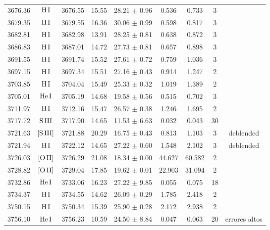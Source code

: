 \documentclass{article}
\begin{document}
\begin{table*}
\begin{adjustbox}{width=\textwidth}
\begin{tabular}{ccccccccc}
3676.36 & $\mbox{H}\thinspace \mbox{I}$ & 3676.55 & 15.55 & 28.21 $\pm$ 0.96 & 0.536 & 0.733 & 3 &  \\
3679.35 & $\mbox{H}\thinspace \mbox{I}$ & 3679.55 & 16.36 & 30.06 $\pm$ 0.99 & 0.598 & 0.817 & 3 &  \\
3682.81 & $\mbox{H}\thinspace \mbox{I}$ & 3682.98 & 13.91 & 28.25 $\pm$ 0.81 & 0.638 & 0.872 & 3 &  \\
3686.83 & $\mbox{H}\thinspace \mbox{I}$ & 3687.01 & 14.72 & 27.73 $\pm$ 0.81 & 0.657 & 0.898 & 3 &  \\
3691.55 & $\mbox{H}\thinspace \mbox{I}$ & 3691.74 & 15.52 & 27.61 $\pm$ 0.72 & 0.759 & 1.036 & 3 &  \\
3697.15 & $\mbox{H}\thinspace \mbox{I}$ & 3697.34 & 15.51 & 27.16 $\pm$ 0.43 & 0.914 & 1.247 & 2 &  \\
3703.85 & $\mbox{H}\thinspace \mbox{I}$ & 3704.04 & 15.49 & 25.33 $\pm$ 0.32 & 1.019 & 1.389 & 2 &  \\
3705.01 & $\mbox{He}\thinspace \mbox{I}$ & 3705.19 & 14.68 & 19.58 $\pm$ 0.56 & 0.515 & 0.702 & 3 &  \\
3711.97 & $\mbox{H}\thinspace \mbox{I}$ & 3712.16 & 15.47 & 26.57 $\pm$ 0.38 & 1.246 & 1.695 & 2 &  \\
3717.72 & $\mbox{S}\thinspace \mbox{III}$ & 3717.90 & 14.65 & 11.53 $\pm$ 6.63 & 0.032 & 0.043 & 30 &  \\
3721.63 & $\mbox{[S}\thinspace \mbox{III]}$ & 3721.88 & 20.29 & 16.75 $\pm$ 0.43 & 0.813 & 1.103 & 3 &  deblended \\
3721.94 & $\mbox{H}\thinspace \mbox{I}$ & 3722.12 & 14.65 & 27.22 $\pm$ 0.60 & 1.548 & 2.102 & 3 &  deblended \\
3726.03 & $\mbox{[O}\thinspace \mbox{II]}$ & 3726.29 & 21.08 & 18.34 $\pm$ 0.00 & 44.627 & 60.582 & 2 &  \\
3728.82 & $\mbox{[O}\thinspace \mbox{II]}$ & 3729.04 & 17.85 & 19.62 $\pm$ 0.01 & 22.903 & 31.094 & 2 &  \\
3732.86 & $\mbox{He}\thinspace \mbox{I}$ & 3733.06 & 16.23 & 27.22 $\pm$ 9.85 & 0.055 & 0.075 & 18 &  \\
3734.37 & $\mbox{H}\thinspace \mbox{I}$ & 3734.55 & 14.62 & 26.09 $\pm$ 0.29 & 1.785 & 2.418 & 2 &  \\
3750.15 & $\mbox{H}\thinspace \mbox{I}$ & 3750.34 & 15.39 & 25.90 $\pm$ 0.28 & 2.172 & 2.938 & 2 &  \\
3756.10 & $\mbox{He}\thinspace \mbox{I}$ & 3756.23 & 10.59 & 24.50 $\pm$ 8.84 & 0.047 & 0.063 & 20 &  errores altos \\

\end{tabular}
\end{adjustbox}
\end{table*}
\end{document}
